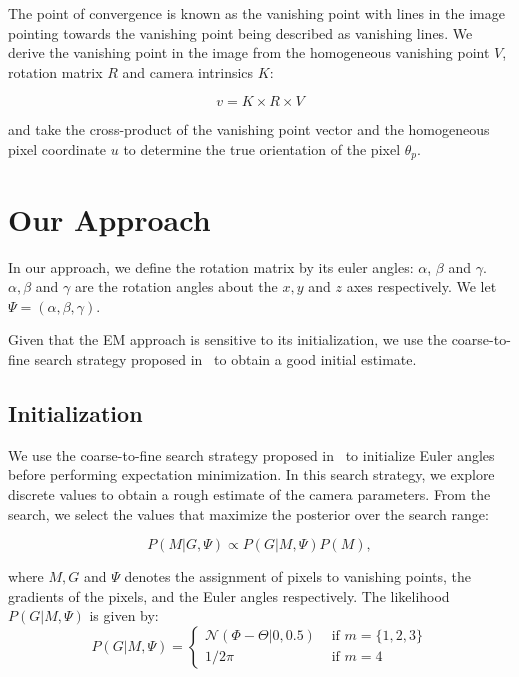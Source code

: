 \documentclass[a4paper]{article}
\begin{document}
	The point of convergence is known as the vanishing point with lines in the image pointing towards the vanishing point being described as vanishing lines. We derive the vanishing point in the image from the homogeneous vanishing point $V$, rotation matrix $R$ and camera intrinsics $K$: 
	
	\begin{equation}
		v = K \times R \times V
	\end{equation}
	
	and take the cross-product of the vanishing point vector and the homogeneous pixel coordinate $u$ to determine the true orientation of the pixel $\theta_p$.
	
	
	\section{Our Approach}
	
	In our approach, we define the rotation matrix by its euler angles: $\alpha$, $\beta$ and $\gamma$. $\alpha, \beta$ and $\gamma$ are the rotation angles about the $x, y$ and $z$ axes respectively. We let $\Psi = (\alpha, \beta, \gamma)$.
	
	Given that the EM approach is sensitive to its initialization, we use the coarse-to-fine search strategy proposed in~\cite{Coughlan:2000:MWA:3008751.3008869} to obtain a good initial estimate. 
	
	\subsection{Initialization}
	
	We use the coarse-to-fine search strategy proposed in~\cite{Coughlan:2000:MWA:3008751.3008869} to initialize Euler angles before performing expectation minimization. In this search strategy, we explore discrete values to obtain a rough estimate of the camera parameters. From the search, we select the values that maximize the posterior over the search range:
	
	\begin{equation}
		P\left(M | G, \Psi\right) \propto P\left(G | M, \Psi\right) P(M),
	\end{equation}
	
	where $M, G$ and $\Psi$ denotes the assignment of pixels to vanishing points, the gradients of the pixels, and the Euler angles respectively. The likelihood $P\left(G | M, \Psi \right)$ is given by: 
	\begin{equation}
	P\left(G | M, \Psi \right)=\left\{\begin{array}{ll}\mathcal{N}(\Phi - \Theta |0, 0.5) & {\text { if } m = \{1, 2, 3\}} \\ {1 / 2\pi} & {\text { if } m=4}\end{array}\right.
	\end{equation}
	
\end{document}
